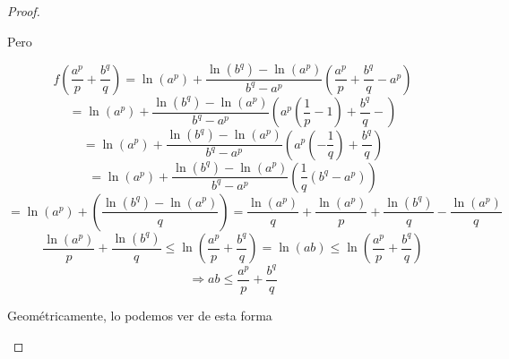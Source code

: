 \begin{proof}
\begin{enumerate}
        Pero

        \begin{equation*}
            f\left( \frac{a^p}{p}+ \frac{b^q}{q} \right) = \ln(a^p)+ \frac{\ln(b^q)-\ln(a^p)}{b^q-a^p} \left( \frac{a^p}{p}+ \frac{b^q}{q}-a^p \right)
        \end{equation*}
        \begin{equation*}
             = \ln(a^p)+ \frac{\ln(b^q)-\ln(a^p)}{b^q-a^p} \left( a^p  \left( \frac{1}{p}-1 \right)+ \frac{b^q}{q}-\right)
        \end{equation*}
        \begin{equation*}
             = \ln(a^p)+ \frac{\ln(b^q)-\ln(a^p)}{b^q-a^p} \left( a^p  \left( -\frac{1}{q} \right)+ \frac{b^q}{q}\right)
        \end{equation*}
        \begin{equation*}
             = \ln(a^p)+ \frac{\ln(b^q)-\ln(a^p)}{b^q-a^p} \left( \frac{1}{q} (b^q-a^p) \right)
        \end{equation*}
        \begin{equation*}
             = \ln(a^p) + \left( \frac{\ln(b^q)-\ln(a^p)}{q} \right) = \frac{\ln(a^p)}{q} + \frac{\ln(a^p)}{p}+ \frac{\ln(b^q)}{q}- \frac{\ln(a^p)}{q}
        \end{equation*}
        \begin{equation*}
              \frac{\ln(a^p)}{p}+ \frac{\ln(b^q)}{q} \leqslant \ln( \frac{a^p}{p}+ \frac{b^q}{q}) = \ln(ab) \leqslant \ln( \frac{a^p}{p}+ \frac{b^q}{q})
        \end{equation*}
        \begin{equation*}
            \Rightarrow ab \leqslant \frac{a^p}{p}+ \frac{b^q}{q}
        \end{equation*}

        Geométricamente, lo podemos ver de esta forma

    \begin{center}
\end{center}
\end{enumerate}
\end{proof}
